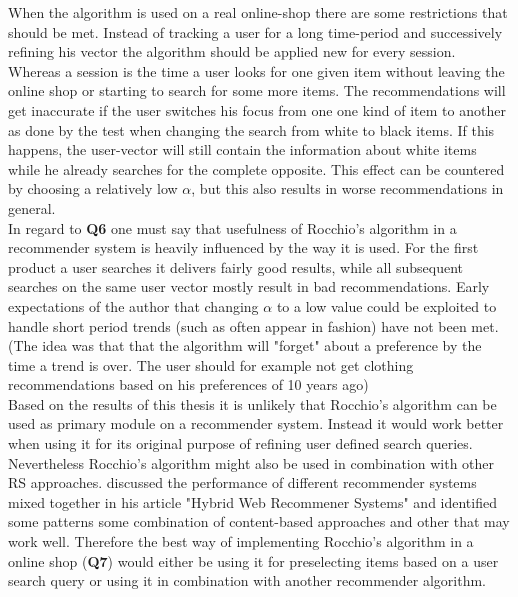 \noindent
When the algorithm is used on a real online-shop there are some restrictions that should be met.
Instead of tracking a user for a long time-period and successively refining his vector the algorithm should be applied new for every session.
Whereas a session is the time a user looks for one given item without leaving the online shop or starting to search for some more items.
The recommendations will get inaccurate if the user switches his focus from one one kind of item to another as done by the test when changing the search from white to black items.
If this happens, the user-vector will still contain the information about white items while he already searches for the complete opposite.
This effect can be countered by choosing a relatively low $\alpha$, but this also results in worse recommendations in general.
\\
In regard to \textbf{Q6} one must say that usefulness of Rocchio's algorithm in a recommender system is heavily influenced by the way it is used.
For the first product a user searches it delivers fairly good results, while all subsequent searches on the same user vector mostly result in bad recommendations.
Early expectations of the author that changing $\alpha$ to a low value could be exploited to handle short period trends (such as often appear in fashion) have not been met.
(The idea was that that the algorithm will "forget" about a preference by the time a trend is over. The user should for example not get clothing recommendations based on his preferences of 10 years ago)
\\

\noindent
Based on the results of this thesis it is unlikely that Rocchio's algorithm can be used as primary module on a recommender system.
Instead it would work better when using it for its original purpose of refining user defined search queries.
Nevertheless Rocchio's algorithm might also be used in combination with other RS approaches.
\citeauthor{burke:2007} discussed the performance of different recommender systems mixed together in his article "Hybrid Web Recommener Systems" and identified some patterns some combination of content-based approaches and other that may work well.
Therefore the best way of implementing Rocchio's algorithm in a online shop (\textbf{Q7}) would either be using it for preselecting items based on a user search query or using it in combination with another recommender algorithm.


